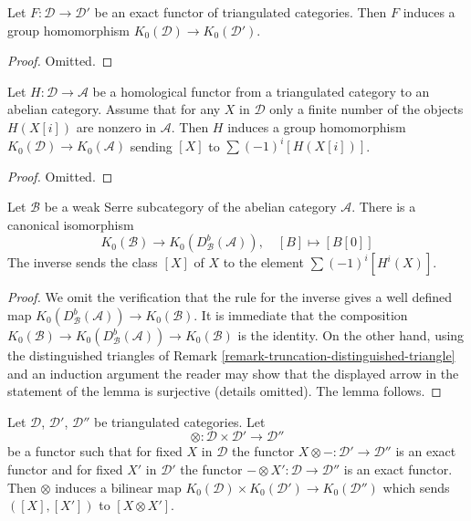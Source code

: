 \begin{lemma}
\label{lemma-map-K}
Let $F : \mathcal{D} \to \mathcal{D}'$ be an exact functor of triangulated
categories. Then $F$ induces a group homomorphism
$K_0(\mathcal{D}) \to K_0(\mathcal{D}')$.
\end{lemma}

\begin{proof}
Omitted.
\end{proof}

\begin{lemma}
\label{lemma-homological-map-K}
Let $H : \mathcal{D} \to \mathcal{A}$ be a homological functor
from a triangulated category to an abelian category. Assume that
for any $X$ in $\mathcal{D}$ only a finite number of the objects
$H(X[i])$ are nonzero in $\mathcal{A}$. Then $H$ induces a group homomorphism
$K_0(\mathcal{D}) \to K_0(\mathcal{A})$ sending $[X]$ to
$\sum (-1)^i[H(X[i])]$.
\end{lemma}

\begin{proof}
Omitted.
\end{proof}

\begin{lemma}
\label{lemma-DBA-map-K}
Let $\mathcal{B}$ be a weak Serre subcategory of the abelian category
$\mathcal{A}$. There is a canonical isomorphism
$$
K_0(\mathcal{B}) \longrightarrow
K_0(D^b_\mathcal{B}(\mathcal{A})),\quad
[B] \longmapsto [B[0]]
$$
The inverse sends the class $[X]$ of $X$
to the element $\sum (-1)^i[H^i(X)]$.
\end{lemma}

\begin{proof}
We omit the verification that the rule for the inverse gives a well defined
map $K_0(D^b_\mathcal{B}(\mathcal{A})) \to K_0(\mathcal{B})$.
It is immediate that the composition
$K_0(\mathcal{B}) \to
K_0(D^b_\mathcal{B}(\mathcal{A})) \to
K_0(\mathcal{B})$ is the identity. On the other hand, using the
distinguished triangles of
Remark \ref{remark-truncation-distinguished-triangle} and an
induction argument the reader may show that the displayed arrow
in the statement of the lemma is surjective (details omitted).
The lemma follows.
\end{proof}

\begin{lemma}
\label{lemma-bilinear-map-K}
Let $\mathcal{D}$, $\mathcal{D}'$, $\mathcal{D}''$ be triangulated categories.
Let
$$
\otimes : \mathcal{D} \times \mathcal{D}' \longrightarrow \mathcal{D}''
$$
be a functor such that for fixed $X$ in $\mathcal{D}$ the functor
$X \otimes - : \mathcal{D}' \to \mathcal{D}''$ is an exact functor and
for fixed $X'$ in $\mathcal{D}'$ the functor
$- \otimes X' : \mathcal{D} \to \mathcal{D}''$ is an exact functor. Then
$\otimes$ induces a bilinear map
$K_0(\mathcal{D}) \times K_0(\mathcal{D}') \to K_0(\mathcal{D}'')$
which sends $([X], [X'])$ to $[X \otimes X']$.
\end{lemma}


